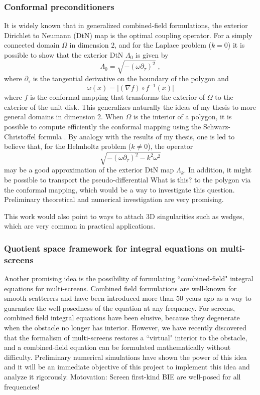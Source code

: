 \documentclass[]{report}
\newcommand{\rh}[1]{{\color{magenta}#1}}
\begin{document}
\subsubsection*{Conformal preconditioners}

It is widely known that in generalized combined-field formulations, the exterior Dirichlet
to Neumann (DtN) map is the optimal coupling operator. For a simply connected domain
$\Omega$ in dimension $2$, and for the Laplace problem ($k = 0$) it is possible to show
that the exterior DtN $\Lambda_0$ is given by
\[\Lambda_0 = \sqrt{-(\omega \partial_\tau)^2}\;,\]
where $\partial_\tau$ is the tangential derivative on the boundary of the polygon
and \[\omega(x) = \lvert (\nabla f) \circ f^{-1}(x)\rvert\] where $f$ is the conformal
mapping that transforms the exterior of $\Omega$ to the exterior of the unit disk. This
generalizes naturally the ideas of my thesis to more general domains in dimension 2. When
$\Omega$ is the interior of a polygon, it is possible to compute efficiently the conformal
mapping using the Schwarz-Christoffel formula \cite{driscoll2002schwarz}. By
analogy with the results of my thesis, one is led to believe that, for the Helmholtz
problem ($k \neq 0$), the operator
\[\sqrt{-(\omega \partial_\tau)^2 - k^2\omega^2}\]
may be a good approximation of the exterior DtN map $\Lambda_k$. In addition, it might be
possible to transport the pseudo-differential \rh{What is this?} to the polygon via the conformal mapping,
which would be a way to investigate this question. Preliminary theoretical and numerical
investigation are very promising.

This work would also point to ways to attach 3D singularities such as wedges, which are
very common  in practical applications.

\subsubsection*{Quotient space framework for integral equations on multi-screens}

Another promising idea is the possibility of formulating ``combined-field" integral
equations for multi-screens. Combined field formulations are well-known for smooth
scatterers and have been introduced more than 50 years ago
\cite{brakhage1965dirichletsehe} as a way to guarantee the well-posedness of the equation
at any frequency. For screens, combined field integral equations have been elusive,
because they degenerate when the obstacle no longer has interior.  However, we have
recently discovered that the formalism of multi-screens restores a ``virtual" interior to
the obstacle, and a combined-field equation can be formulated mathematically without
difficulty. Preliminary numerical simulations have shown the power of this idea and it
will be an immediate objective of this project to implement this idea and analyze it
rigorously.  \rh{Motovation: Screen first-kind BIE are well-posed for all frequencies!}
\end{document}
